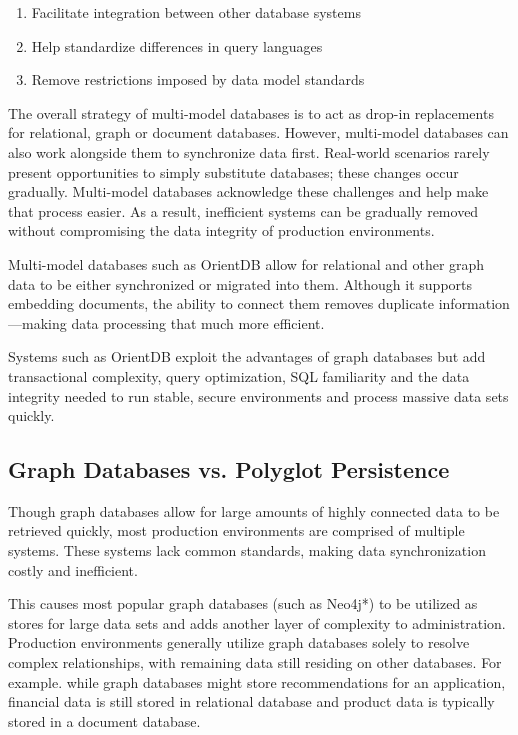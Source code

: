 \documentclass[
	final,
	a4paper,
	oneside,
	parskip=half,
	headings=standardclasses,
	headings=big,
	pointednumbers,
    fleqn
]{scrartcl}
\begin{document}
\begin{multicols*}{2}
            \begin{enumerate}
                \item Facilitate integration between other database systems
                \item Help standardize differences in query languages
                \item Remove restrictions imposed by data model standards
            \end{enumerate}

            The overall strategy of multi-model databases is to act as drop-in replacements for relational, graph or document databases. However, multi-model databases can also work alongside them to synchronize data first. Real-world scenarios rarely present opportunities to simply substitute databases; these changes occur gradually. Multi-model databases acknowledge these challenges and help make that process easier. As a result, inefficient systems can be gradually removed without compromising the data integrity of production environments.
            
            Multi-model databases such as OrientDB allow for relational and other graph data to be either synchronized or migrated into them. Although it supports embedding documents, the ability to connect them removes duplicate information—making data processing that much more efficient.
            
            Systems such as OrientDB exploit the advantages of graph databases but add transactional complexity, query optimization, SQL familiarity and the data integrity needed to run stable, secure environments and process massive data sets quickly.

        \subsection{Graph Databases vs. Polyglot Persistence}

            Though graph databases allow for large amounts of highly connected data to be retrieved quickly, most production environments are comprised of multiple systems. These systems lack common standards, making data synchronization costly and inefficient.
            
            This causes most popular graph databases (such as Neo4j*) to be utilized as stores for large data sets and adds another layer of complexity to administration. Production environments generally utilize graph databases solely to resolve complex relationships, with remaining data still residing on other databases. For example. while graph databases might store recommendations for an application, financial data is still stored in relational database and product data is typically stored in a document database.
            

\end{multicols*}
\end{document}

